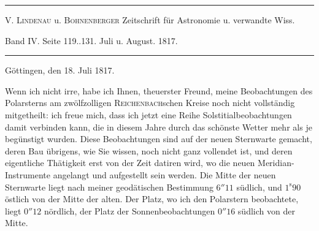 \clearpage{}\hypertarget{native-398-part-lower}{}\label{native-398-part-lower}
\begin{center}\hrule\vspace{4pt}\fontsize{10}{12}\selectfont
V. \textsc{Lindenau} u. \textsc{Bohnenberger} Zeitschrift für Astronomie u. verwandte Wiss.\par
Band IV. Seite 119..131. Juli u. August. 1817.\par\vspace{4pt}\hrule\vspace{4pt}\end{center}
\begin{flushright}Göttingen, den 18. Juli 1817.\end{flushright}
\par\indent Wenn ich nicht irre, habe ich Ihnen, theuerster Freund, meine Beobachtungen des Polarsterns am zwölfzolligen \textsc{Reichenbach}schen Kreise noch nicht vollständig mitgetheilt: ich freue mich, dass ich  jetzt eine Reihe Solstitialbeobachtungen damit verbinden kann, die in diesem Jahre durch das schönste Wetter mehr als je begünstigt wurden. Diese Beobachtungen sind auf der neuen Sternwarte gemacht, deren Bau übrigens, wie Sie wissen, noch nicht ganz vollendet ist, und deren eigentliche Thätigkeit erst von der Zeit datiren wird, wo die neuen Meridian-Instrumente angelangt und aufgestellt sein werden. Die Mitte der neuen Sternwarte liegt nach meiner geodätischen Bestimmung $6''11$ südlich, und $1^{\mathrm s}90$ östlich von der Mitte der alten. Der Platz, wo ich den Polarstern beobachtete, liegt $0''12$ nördlich, der Platz der Sonnenbeobachtungen $0''16$ südlich von der Mitte.

